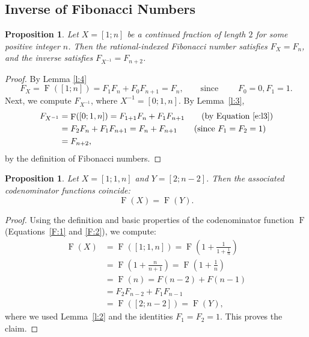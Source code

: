 \documentclass[11pt,reqno]{amsart}
\numberwithin{equation}{section}
\numberwithin{table}{section}
\numberwithin{figure}{section}
\DeclareMathOperator{\F}{F}
\theoremstyle{plain}
\newtheorem{proposition}[thm]{Proposition}
\theoremstyle{definition}
\theoremstyle{remark}
\begin{document}
\subsection{ Inverse of Fibonacci Numbers}	
\begin{proposition}\label{p:f1}	Let $X = [1; n]$ be a continued fraction of length $2$ for some positive integer $n$. 	Then the rational-indexed Fibonacci number satisfies $F_X = F_n$, and the inverse satisfies $F_{X^{-1}} = F_{n+2}$.	\end{proposition}	\begin{proof}	By Lemma \ref{l:4}	\begin{equation*}		F_X = \F([1; n]) = F_1F_n + F_0F_{n+1} = F_n, \qquad \text{since }\qquad F_0 =0, F_1=1.	\end{equation*}		Next, we compute $F_{X^{-1}}$, where $X^{-1} = [0; 1, n]$. By Lemma~\ref{l:3},	\begin{align*}		F_{X^{-1}} & = \F([0; 1, n]) = F_{1+1}F_n + F_1F_{n+1} \qquad \text{(by Equation \ref{e:l3})}\\		&= F_2F_n + F_1F_{n+1} = F_n + F_{n+1}\qquad \text{(since $F_1 = F_2 = 1$)}\\		& = F_{n+2},	\end{align*}	by the definition of Fibonacci numbers.	\end{proof}\begin{proposition}	Let $X = [1; 1, n]$ and $Y = [2; n-2]$. 	Then the associated codenominator functions coincide:	\[	\F(X) = \F(Y).	\]\end{proposition}\begin{proof}	Using the definition and basic properties of the codenominator function $\F$ (Equations~\ref{F:1} and \ref{F:2}), we compute:	\begin{align*}		\F(X) &= \F([1; 1, n]) 		= \F\!\left(1 + \frac{1}{1 + \frac{1}{n}}\right) \\		&= \F\!\left(1 + \frac{n}{n+1}\right) 		= \F\!\left(1 + \frac{1}{n}\right) \\		&= \F(n) = F(n-2) + F(n-1) \\		&= F_2F_{n-2} + F_1F_{n-1} \\		&= \F([2; n-2]) = \F(Y),	\end{align*}	where we used Lemma~\ref{l:2} and the identities $F_1 = F_2 = 1$. 	This proves the claim.\end{proof}
\end{document}
